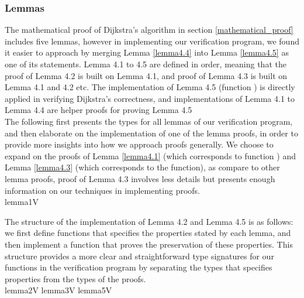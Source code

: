 \subsubsection{Lemmas} \label{lemmas}
The mathematical proof of Dijkstra's algorithm in section \ref{mathematical_proof} includes five lemmas, however in implementing our verification program, we found it easier to approach by merging Lemma \ref{lemma4.4} into Lemma \ref{lemma4.5} as one of its statements. Lemma 4.1 to 4.5 are defined in order, meaning that the proof of Lemma 4.2 is built on Lemma 4.1, and proof of Lemma 4.3 is built on Lemma 4.1 and 4.2 etc. The implementation of Lemma 4.5 (function ) is directly applied in verifying Dijkstra's correctness, and implementations of Lemma 4.1 to Lemma 4.4 are helper proofs for proving Lemma 4.5
\\

The following first presents the types for all lemmas of our verification program, and then elaborate on the implementation of one of the lemma proofs, in order to provide more insights into how we approach proofs generally. We choose to expand on the proofs of Lemma \ref{lemma4.1} (which corresponds to function ) and Lemma \ref{lemma4.3} (which corresponds to the  function), as compare to other lemma proofs, proof of Lemma 4.3 involves less details but presents enough information on our techniques in implementing proofs. 
\\

{lemma1V}

The structure of the implementation of Lemma 4.2 and Lemma 4.5 is as follows: we first define functions that specifies the  properties stated by each lemma, and then implement a function that proves the preservation of these properties. This structure provides a more clear and straightforward type signatures for our functions in the verification program by separating the types that specifies  properties from the types of the proofs. 
\\

{lemma2V}
{lemma3V}
{lemma5V}